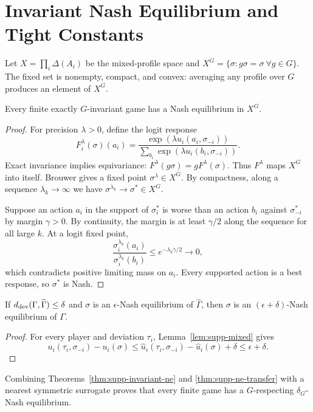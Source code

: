 \section{Invariant Nash Equilibrium and Tight Constants}

Let $X=\prod_i\Delta(A_i)$ be the mixed-profile space and
$X^G=\{\sigma:g\sigma=\sigma\ \forall g\in G\}$.  The fixed set is nonempty, compact, and convex: averaging any profile over $G$ produces an element of $X^G$.

\begin{theorem}
\label{thm:supp-invariant-ne}
Every finite exactly $G$-invariant game has a Nash equilibrium in $X^G$.
\end{theorem}
\begin{proof}
For precision $\lambda>0$, define the logit response
\[
F_i^\lambda(\sigma)(a_i)
=
\frac{\exp(\lambda u_i(a_i,\sigma_{-i}))}
{\sum_{b_i}\exp(\lambda u_i(b_i,\sigma_{-i}))}.
\]
Exact invariance implies equivariance:
$F^\lambda(g\sigma)=gF^\lambda(\sigma)$.  Thus $F^\lambda$ maps $X^G$ into itself.  Brouwer gives a fixed point $\sigma^\lambda\in X^G$.  By compactness, along a sequence $\lambda_k\to\infty$ we have
$\sigma^{\lambda_k}\to\sigma^*\in X^G$.

Suppose an action $a_i$ in the support of $\sigma_i^*$ is worse than an action $b_i$ against $\sigma_{-i}^*$ by margin $\gamma>0$.  By continuity, the margin is at least $\gamma/2$ along the sequence for all large $k$.  At a logit fixed point,
\[
\frac{\sigma_i^{\lambda_k}(a_i)}
{\sigma_i^{\lambda_k}(b_i)}
\le e^{-\lambda_k\gamma/2}\to0,
\]
which contradicts positive limiting mass on $a_i$.  Every supported action is a best response, so $\sigma^*$ is Nash.
\end{proof}

\begin{theorem}
\label{thm:supp-ne-transfer}
If $d_{\mathrm{dev}}(\Gamma,\widehat\Gamma)\le\delta$ and $\sigma$ is an $\epsilon$-Nash equilibrium of $\widehat\Gamma$, then $\sigma$ is an $(\epsilon+\delta)$-Nash equilibrium of $\Gamma$.
\end{theorem}
\begin{proof}
For every player and deviation $\tau_i$, Lemma~\ref{lem:supp-mixed} gives
\[
u_i(\tau_i,\sigma_{-i})-u_i(\sigma)
\le
\widehat u_i(\tau_i,\sigma_{-i})-
\widehat u_i(\sigma)+\delta
\le\epsilon+\delta.
\]
\end{proof}

Combining Theorems~\ref{thm:supp-invariant-ne} and
\ref{thm:supp-ne-transfer} with a nearest symmetric surrogate proves that every finite game has a $G$-respecting $\delta_G$-Nash equilibrium.

